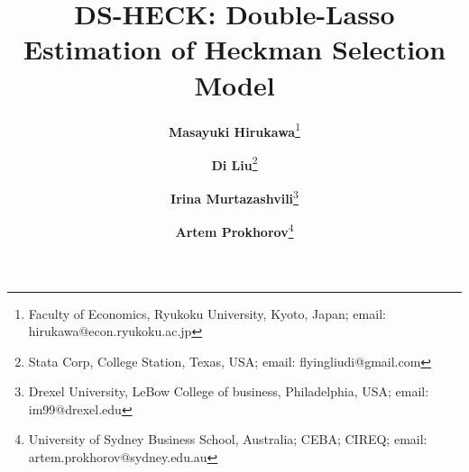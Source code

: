\textwidth 6.5in \topmargin -0.5in \oddsidemargin -0.2in \textheight 9in
\usepackage[round]{natbib}
\usepackage{lmodern}
\usepackage{setspace}
\usepackage{amsfonts}
\usepackage{amssymb}
\usepackage{amsmath}
\usepackage{amsthm}
\usepackage{graphicx}
\usepackage{subfig}
\usepackage{comment}
\usepackage{float}
\usepackage{listings}
\usepackage[bookmarks=true]{hyperref}
\usepackage[round]{natbib}
\usepackage{color}
\usepackage{multirow}
\usepackage{lscape}
\usepackage[ruled,vlined]{algorithm2e}
\usepackage[titletoc]{appendix}
\usepackage{stata}
\usepackage{longtable, ltcaption}



\title{DS-HECK: Double-Lasso Estimation of Heckman Selection Model}


\author{\textbf{Masayuki Hirukawa}\footnote{Faculty of Economics, Ryukoku
University, Kyoto, Japan; email: \textsf{hirukawa@econ.ryukoku.ac.jp}} 
\and
\textbf{Di Liu}\footnote{Stata Corp, College Station, Texas, USA; email:
\textsf{flyingliudi@gmail.com}} 
\and 
\textbf{Irina Murtazashvili}\footnote{Drexel University, LeBow College of
business, Philadelphia, USA; email: 
\textsf{im99@drexel.edu}}
\and
\textbf{Artem Prokhorov}\footnote{University of Sydney Business School,
Australia; CEBA; CIREQ; email: \textsf{artem.prokhorov@sydney.edu.au} } }

\date{\firstdraft \quad \thisdraft}


\newcommand{\En}{ \mathbb{E}_N }
\newcommand{\Ind}{\mathbb{I}}
\newcommand{\E}{ \mathop{\mathbb{E}} }
\DeclareMathOperator*{\argmin}{arg\,min}
\newtheorem{prop}{Proposition}
\newtheorem{defi}{Definition}
\newtheorem{assumption}{Assumption}
\newcommand{\dvar}{\mathbf{d}}
\newcommand{\zvar}{\mathbf{z}}
\newcommand{\uvar}{\mathbf{u}}
\newcommand{\alphab}{\mathbf{\alpha}}
\newcommand{\betab}{\mathbf{\beta}}
\newcommand{\etab}{\mathbf{\eta}}
\newcommand{\thetab}{\mathbb{\theta}}
\newcommand{\dsheck}{{\bf DS-HECK}}
\newcommand{\kd}{k_d}
\newcommand{\kz}{k_z}
\newcommand{\xvar}{\mathbf{x}}
\newcommand{\yvar}{\mathbf{y}}

\newcommand{\dil}[1]{{\color{red}#1}}

